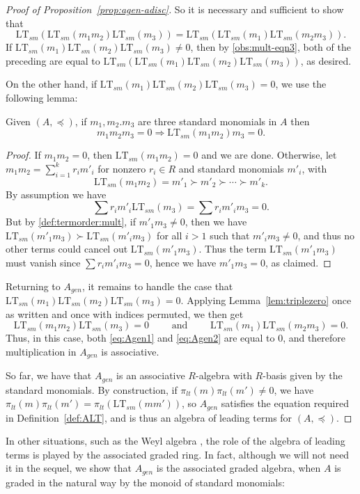 \documentclass[11pt,reqno]{amsart}
\newcommand{\ltsm}{\text{LT}_{sm}}
\theoremstyle{definition}
\numberwithin{equation}{section}
\begin{document}
\begin{proof}[Proof of Proposition~\ref{prop:agen-adisc}]
So it is necessary and sufficient to show that 
\[
\ltsm(\ltsm(m_1 m_2) \ltsm(m_3)) = \ltsm(\ltsm(m_1) \ltsm(m_2 m_3)). 
\]
If $\ltsm(m_1) \ltsm(m_2) \ltsm(m_3) \neq 0$, then by \eqref{obs:mult-eqn3}, both of the preceding are equal to $\ltsm(\ltsm(m_1) \ltsm(m_2) \ltsm(m_3))$, as desired.

On the other hand, if $\ltsm(m_1) \ltsm(m_2) \ltsm(m_3) = 0$, we use the following lemma:

\begin{lemma} \label{lem:triplezero}
Given $(A,\preceq)$, if $m_1,m_2.m_3$ are three standard monomials in $A$ then
\[
m_1 m_2 m_3 = 0 \Rightarrow \ltsm(m_1 m_2) m_3 = 0.
\]
\end{lemma}

\begin{proof}
If $m_1 m_2 = 0$, then $\ltsm(m_1 m_2) = 0$ and we are done. Otherwise, let $m_1 m_2 = \sum_{i=1}^k r_i m'_i$ for nonzero $r_i \in R$ and standard monomials $m'_i$, with 
\[
\ltsm(m_1 m_2) = m'_1 \succ m'_2 \succ \dotsb \succ m'_k.
\] 
By assumption we have 
\[
\sum r_i m'_i \ltsm(m_3) = \sum r_i m'_i m_3 = 0.
\]
But by \ref{def:termorder:mult}, if $m'_1 m_3 \neq 0$, then we have $\ltsm(m'_1 m_3) \succ \ltsm(m'_i m_3)$ for all $i > 1$ such that $m'_i m_3 \neq 0$, and thus no other terms could cancel out $\ltsm(m'_1 m_3)$. Thus the term $\ltsm(m'_1 m_3)$ must vanish since $\sum r_i m'_i m_3 = 0$, hence we have $m'_1 m_3 = 0$, as claimed.
\end{proof}

Returning to $A_{gen}$, it remains to handle the case that $\ltsm(m_1) \ltsm(m_2) \ltsm(m_3) = 0$. Applying Lemma~\ref{lem:triplezero} once as written and once with indices permuted, we then get
\[
\ltsm(m_1 m_2) \ltsm(m_3) = 0 \qquad \text{ and } \qquad \ltsm(m_1) \ltsm(m_2 m_3) = 0.
\]
Thus, in this case, both \eqref{eq:Agen1} and \eqref{eq:Agen2} are equal to 0, and therefore multiplication in $A_{gen}$ is associative.

So far, we have that $A_{gen}$ is an associative $R$-algebra with $R$-basis given by the standard monomials. By construction, if $\pi_{lt}(m) \pi_{lt}(m') \neq 0$, we have $\pi_{lt}(m) \pi_{lt}(m') = \pi_{lt}(\ltsm(mm'))$, so $A_{gen}$ satisfies the equation required in Definition~\ref{def:ALT}, and is thus an algebra of leading terms for $(A,\preceq)$.
\end{proof}

In other situations, such as the Weyl algebra \cite[Section~1.1]{saito1998grobner}, the role of the algebra of leading terms is played by the associated graded ring. In fact, although we will not need it in the sequel, we show that $A_{gen}$ is the associated graded algebra, when $A$ is graded in the natural way by the monoid of standard monomials:
\end{document}
